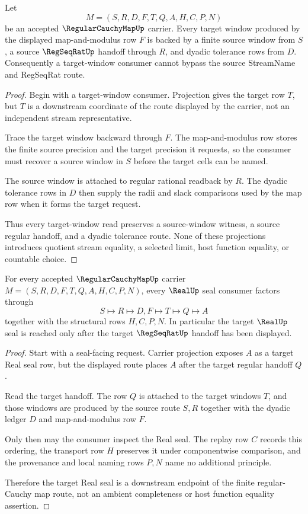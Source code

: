 \begin{theorem}
\label{thm:regular-cauchy-map-source-window-preservation}
Let
$$
M=(S,R,D,F,T,Q,A,H,C,P,N)
$$
be an accepted $\RegularCauchyMapUp$ carrier. Every target window produced by the displayed map-and-modulus row $F$ is backed by a finite source window from $S$, a source $\RegSeqRatUp$ handoff through $R$, and dyadic tolerance rows from $D$. Consequently a target-window consumer cannot bypass the source StreamName and RegSeqRat route.
\end{theorem}
\begin{proof}
Begin with a target-window consumer. Projection gives the target row $T$, but $T$ is a downstream coordinate of the route displayed by the carrier, not an independent stream representative.

Trace the target window backward through $F$. The map-and-modulus row stores the finite source precision and the target precision it requests, so the consumer must recover a source window in $S$ before the target cells can be named.

The source window is attached to regular rational readback by $R$. The dyadic tolerance rows in $D$ then supply the radii and slack comparisons used by the map row when it forms the target request.

Thus every target-window read preserves a source-window witness, a source regular handoff, and a dyadic tolerance route. None of these projections introduces quotient stream equality, a selected limit, host function equality, or countable choice.
\end{proof}

\begin{theorem}
\label{thm:regular-cauchy-map-real-seal-handoff}
For every accepted $\RegularCauchyMapUp$ carrier $M=(S,R,D,F,T,Q,A,H,C,P,N)$, every $\RealUp$ seal consumer factors through
$$
S\longmapsto R\longmapsto D,F\longmapsto T\longmapsto Q\longmapsto A
$$
together with the structural rows $H,C,P,N$. In particular the target $\RealUp$ seal is reached only after the target $\RegSeqRatUp$ handoff has been displayed.
\end{theorem}
\begin{proof}
Start with a seal-facing request. Carrier projection exposes $A$ as a target Real seal row, but the displayed route places $A$ after the target regular handoff $Q$.

Read the target handoff. The row $Q$ is attached to the target windows $T$, and those windows are produced by the source route $S,R$ together with the dyadic ledger $D$ and map-and-modulus row $F$.

Only then may the consumer inspect the Real seal. The replay row $C$ records this ordering, the transport row $H$ preserves it under componentwise comparison, and the provenance and local naming rows $P,N$ name no additional principle.

Therefore the target Real seal is a downstream endpoint of the finite regular-Cauchy map route, not an ambient completeness or host function equality assertion.
\end{proof}

